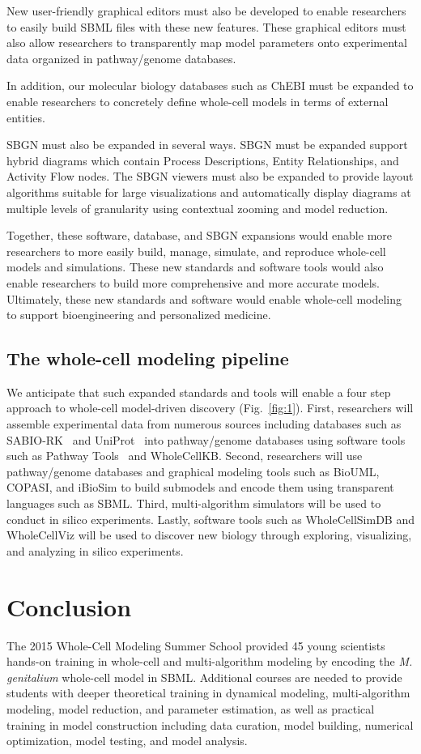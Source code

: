 \documentclass[journal,transmag]{IEEEtran}
\begin{document}
New user-friendly graphical editors must also be developed to enable researchers to easily build SBML files with these new features. These graphical editors must also allow researchers to transparently map model parameters onto experimental data organized in pathway/genome databases.

In addition, our molecular biology databases such as ChEBI must be expanded to enable researchers to concretely define whole-cell models in terms of external entities. 

SBGN must also be expanded in several ways. SBGN must be expanded support hybrid diagrams which contain Process Descriptions, Entity Relationships, and Activity Flow nodes. The SBGN viewers must also be expanded to provide layout algorithms suitable for large visualizations and automatically display diagrams at multiple levels of granularity using contextual zooming and model reduction. 

Together, these software, database, and SBGN expansions would enable more researchers to more easily build, manage, simulate, and reproduce whole-cell models and simulations. These new standards and software tools would also enable researchers to build more comprehensive and more accurate models. Ultimately, these new standards and software would enable whole-cell modeling to support bioengineering and personalized medicine.

\subsection{The whole-cell modeling pipeline}
We anticipate that such expanded standards and tools will enable a four step approach to whole-cell model-driven discovery (Fig.~\ref{fig:1}). First, researchers will assemble experimental data from numerous sources including databases such as SABIO-RK~\cite{Wittig2012} and UniProt~\cite{UniProt2015} into pathway/genome databases using software tools such as Pathway Tools~\cite{Karp2010} and WholeCellKB. Second, researchers will use pathway/genome databases and graphical modeling tools such as BioUML, COPASI, and iBioSim to build submodels and encode them using transparent languages such as SBML. Third, multi-algorithm simulators will be used to conduct in silico experiments. Lastly, software tools such as WholeCellSimDB and WholeCellViz will be used to discover new biology through exploring, visualizing, and analyzing in silico experiments.

\section{Conclusion}
The 2015 Whole-Cell Modeling Summer School provided 45 young scientists hands-on training in whole-cell and multi-algorithm modeling by encoding the \textit{M. genitalium} whole-cell model in SBML. Additional courses are needed to provide students with deeper theoretical training in dynamical modeling, multi-algorithm modeling, model reduction, and parameter estimation, as well as practical training in model construction including data curation, model building, numerical optimization, model testing, and model analysis.
\end{document}
